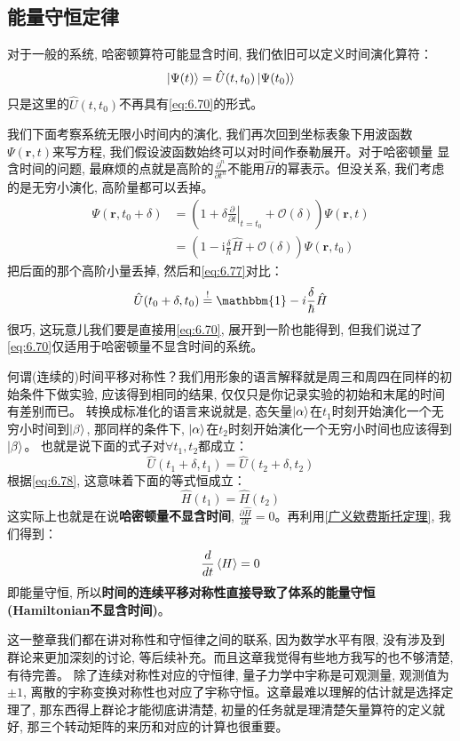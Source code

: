 \documentclass[a4paper,zihao=-4,linespread=1]{ctexrep}
\begin{document}
    \subsection{能量守恒定律}
    对于一般的系统, 哈密顿算符可能显含时间, 我们依旧可以定义时间演化算符：
    \begin{equation}
        \label{eq:6.77}
        \ket{\Psi(t)}=\hat{U}(t,t_0)\ket{\Psi(t_0)}
    \end{equation}
    只是这里的$\hat{U}(t,t_0)$不再具有\ref{eq:6.70}的形式。

    我们下面考察系统无限小时间内的演化, 我们再次回到坐标表象下用波函数$\Psi(\mathbf{r},t)$来写方程, 我们假设波函数始终可以对时间作泰勒展开。对于哈密顿量
    显含时间的问题, 最麻烦的点就是高阶的$\frac{\partial^n}{\partial t^n}$不能用$\hat{H}$的幂表示。但没关系, 我们考虑的是无穷小演化, 高阶量都可以丢掉。
    \begin{align*}
        \Psi(\mathbf{r},t_0+\delta)&=\left(1+\delta\left.\frac{\partial }{\partial t}\right|_{t=t_0}+\mathcal{O}(\delta)\right)\Psi(\mathbf{r},t)\\
        &=\left(1-\mathrm{i}\frac{\delta}{\hbar}\hat{H}+\mathcal{O}(\delta)\right)\Psi(\mathbf{r},t_0)
    \end{align*}
    把后面的那个高阶小量丢掉, 然后和\ref{eq:6.77}对比：
    \begin{equation}
        \label{eq:6.78}
        \hat{U}(t_0+\delta,t_0)\overset{!}{=}\mathbbm{1}-i\frac{\delta}{\hbar}\hat{H}
    \end{equation}
    很巧, 这玩意儿我们要是直接用\ref{eq:6.70}, 展开到一阶也能得到, 但我们说过了\ref{eq:6.70}仅适用于哈密顿量不显含时间的系统。

    何谓(连续的)时间平移对称性？我们用形象的语言解释就是周三和周四在同样的初始条件下做实验, 应该得到相同的结果, 仅仅只是你记录实验的初始和末尾的时间有差别而已。
    转换成标准化的语言来说就是, 态矢量$\ket{\alpha}$在$t_1$时刻开始演化一个无穷小时间到$\ket{\beta}$, 那同样的条件下, $\ket{\alpha}$在$t_2$时刻开始演化一个无穷小时间也应该得到$\ket{\beta}$。
    也就是说下面的式子对$\forall t_1,t_2$都成立：
    \[\hat U(t_1+\delta,t_1)=\hat{U}(t_2+\delta,t_2)\]
    根据\ref{eq:6.78}, 这意味着下面的等式恒成立：
    \[\hat{H}(t_1)=\hat{H}(t_2)\]
    这实际上也就是在说\textbf{哈密顿量不显含时间}, $\frac{\partial \hat{H}}{\partial t}=0$。再利用\ref{广义欸费斯托定理}, 我们得到：
    \[\frac{d}{dt}\braket{H}=0\]
    即能量守恒, 所以\textbf{时间的连续平移对称性直接导致了体系的能量守恒(Hamiltonian不显含时间)}。

    这一整章我们都在讲对称性和守恒律之间的联系, 因为数学水平有限, 没有涉及到群论来更加深刻的讨论, 等后续补充。而且这章我觉得有些地方我写的也不够清楚, 有待完善。
    除了连续对称性对应的守恒律, 量子力学中宇称是可观测量, 观测值为$\pm 1$, 离散的宇称变换对称性也对应了宇称守恒。这章最难以理解的估计就是选择定理了, 那东西得上群论才能彻底讲清楚,
    初量的任务就是理清楚矢量算符的定义就好, 那三个转动矩阵的来历和对应的计算也很重要。
\end{document}
